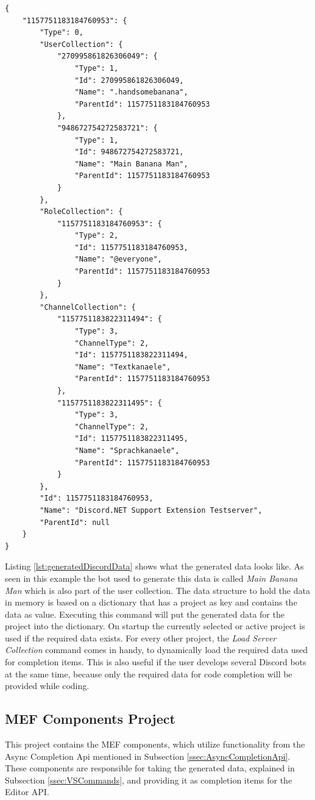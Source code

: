 \newpage
\begin{lstlisting}[caption={Generated data}, label={lst:generatedDiscordData}]
{
	"1157751183184760953": {
		"Type": 0,
		"UserCollection": {
			"270995861826306049": {
				"Type": 1,
				"Id": 270995861826306049,
				"Name": ".handsomebanana",
				"ParentId": 1157751183184760953
			},
			"948672754272583721": {
				"Type": 1,
				"Id": 948672754272583721,
				"Name": "Main Banana Man",
				"ParentId": 1157751183184760953
			}
		},
		"RoleCollection": {
			"1157751183184760953": {
				"Type": 2,
				"Id": 1157751183184760953,
				"Name": "@everyone",
				"ParentId": 1157751183184760953
			}
		},
		"ChannelCollection": {
			"1157751183822311494": {
				"Type": 3,
				"ChannelType": 2,
				"Id": 1157751183822311494,
				"Name": "Textkanaele",
				"ParentId": 1157751183184760953
			},
			"1157751183822311495": {
				"Type": 3,
				"ChannelType": 2,
				"Id": 1157751183822311495,
				"Name": "Sprachkanaele",
				"ParentId": 1157751183184760953
			}
		},
		"Id": 1157751183184760953,
		"Name": "Discord.NET Support Extension Testserver",
		"ParentId": null
	}
}
\end{lstlisting}
Listing \ref{lst:generatedDiscordData} shows what the generated data looks like. As seen in this example the bot used to generate this data is called \textit{Main Banana Man} which is also part of the user collection.
The data structure to hold the data in memory is based on a dictionary that has a project as key and contains the data as value. Executing this command will put the generated data for the project into the dictionary. On startup the currently selected or active project is used if the required data exists. For every other project, the \textit{Load Server Collection} command comes in handy, to dynamically load the required data used for completion items. This is also useful if the user develops several Discord bots at the same time, because only the required data for code completion will be provided while coding.

\subsection{MEF Components Project}
\label{ssec:MEFExtension}
This project contains the MEF components, which utilize functionality from the Async Completion Api mentioned in Subsection \ref{ssec:AsyncCompletionApi}. These components are responsible for taking the generated data, explained in Subsection \ref{ssec:VSCommands}, and providing it as completion items for the Editor API.

